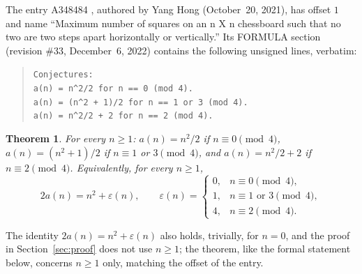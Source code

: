 \documentclass[11pt]{amsart}
\theoremstyle{plain}
\newtheorem{theorem}{Theorem}
\theoremstyle{definition}
\begin{document}
The entry A348484 \cite{A348484}, authored by Yang Hong (October~20, 2021), has offset $1$ and name ``Maximum number of squares on an n X n chessboard such that no two are two steps apart horizontally or vertically.''
Its FORMULA section (revision \#33, December~6, 2022) contains the following unsigned lines, verbatim:
\begin{quote}
{\small\texttt{Conjectures:}\\
\texttt{a(n) = n\^{}2/2 for n == 0 (mod 4).}\\
\texttt{a(n) = (n\^{}2 + 1)/2 for n == 1 or 3 (mod 4).}\\
\texttt{a(n) = n\^{}2/2 + 2 for n == 2 (mod 4).}}
\end{quote}

\begin{theorem}\label{thm:main}
For every $n\ge1$: $a(n)=n^2/2$ if $n\equiv0\pmod4$, $a(n)=(n^2+1)/2$ if $n\equiv1$ or $3\pmod4$, and $a(n)=n^2/2+2$ if $n\equiv2\pmod4$. Equivalently, for every $n\ge1$,
\[
  2a(n)=n^2+\varepsilon(n),\qquad \varepsilon(n)=\begin{cases}0,& n\equiv0\pmod 4,\\ 1,& n\equiv1\text{ or }3\pmod4,\\ 4,& n\equiv2\pmod4.\end{cases}
\]
\end{theorem}

The identity $2a(n)=n^2+\varepsilon(n)$ also holds, trivially, for $n=0$, and the proof in Section~\ref{sec:proof} does not use $n\ge1$; the theorem, like the formal statement below, concerns $n\ge1$ only, matching the offset of the entry.
\end{document}
